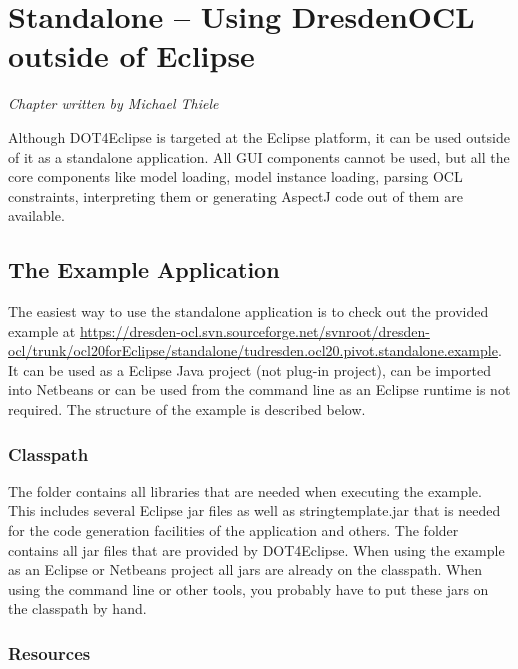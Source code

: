 \chapter{Standalone -- Using DresdenOCL outside of Eclipse}
\label{chapter:standalone}
\lstset{language=Java}

\begin{flushright}
\textit{Chapter written by Michael Thiele}
\end{flushright}

Although \acl{DOT4Eclipse} is targeted at the Eclipse platform, it can be used outside of it as a standalone application. All GUI components cannot be used, but all the core components like model loading, model instance loading, parsing OCL constraints, interpreting them or generating AspectJ code out of them are available.


\section{The Example Application}

The easiest way to use the standalone application is to check out the provided example at \url{https://dresden-ocl.svn.sourceforge.net/svnroot/dresden-ocl/trunk/ocl20forEclipse/standalone/tudresden.ocl20.pivot.standalone.example}. It can be used as a Eclipse Java project (not plug-in project), can be imported into Netbeans or can be used from the command line as an Eclipse runtime is not required. The structure of the example is described below.


\subsection{Classpath}

The  folder contains all libraries that are needed when executing the example. This includes several Eclipse jar files as well as stringtemplate.jar that is needed for the code generation facilities of the application and others. The  folder contains all jar files that are provided by \acl{DOT4Eclipse}. When using the example as an Eclipse or Netbeans project all jars are already on the classpath. When using the command line or other tools, you probably have to put these jars on the classpath by hand.


\subsection{Resources}

